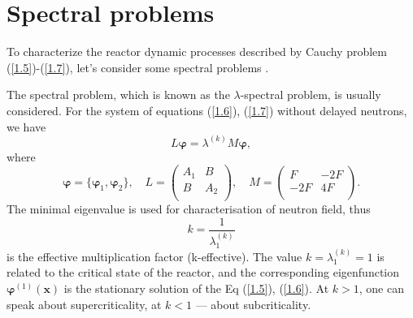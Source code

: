 \documentclass[authoryear]{elsarticle}
\begin{document}
\section{Spectral problems}
To characterize the reactor dynamic processes described by
Cauchy problem (\ref{1.5})-(\ref{1.7}), let’s consider some spectral problems \citep{bell1970,stacey2007}.

The spectral problem, which is known as the $\lambda$-spectral problem, is usually considered.
For the system of equations (\ref{1.6}), (\ref{1.7}) without delayed neutrons, we have
\begin{equation}\label{1.8}
L \bm \varphi = \lambda^{(k)} M \bm \varphi,
\end{equation}
where
\[
\bm \varphi = \{\bm \varphi_1, \bm \varphi_2\},
\quad
L = \begin{pmatrix}
A_1 & B \\
B & A_2 \\
\end{pmatrix},
\quad
M = \begin{pmatrix}
F & -2F \\
-2F & 4F \\
\end{pmatrix}.
\]
The minimal eigenvalue is used for characterisation of neutron field, thus
\[
 k = \frac{1}{\lambda^{(k)}_1}  
\] 
is the effective multiplication factor (k-effective).
The value $k = \lambda^{(k)}_1 = 1$ is related to the critical state of the reactor, and the corresponding eigenfunction $\bm{\varphi}^{(1)}(\bm x)$ is the stationary solution of the Eq (\ref{1.5}), (\ref{1.6}).
At $k > 1$, one can speak about supercriticality, at $k < 1$ --- about subcriticality.

\end{document}
